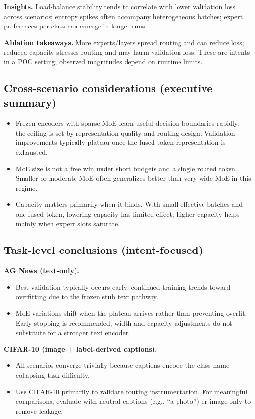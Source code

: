 \documentclass[11pt,a4paper]{article}
\begin{document}
\textbf{Insights.} Load-balance stability tends to correlate with lower validation loss across scenarios; entropy spikes often accompany heterogeneous batches; expert preferences per class can emerge in longer runs.

\textbf{Ablation takeaways.} More experts/layers spread routing and can reduce loss; reduced capacity stresses routing and may harm validation loss. These are intents in a POC setting; observed magnitudes depend on runtime limits.

\subsection*{Cross-scenario considerations (executive summary)}
\begin{itemize}[leftmargin=*]
  \item Frozen encoders with sparse MoE learn useful decision boundaries rapidly; the ceiling is set by representation quality and routing design. Validation improvements typically plateau once the fused-token representation is exhausted.
  \item MoE size is not a free win under short budgets and a single routed token. Smaller or moderate MoE often generalizes better than very wide MoE in this regime.
  \item Capacity matters primarily when it binds. With small effective batches and one fused token, lowering capacity has limited effect; higher capacity helps mainly when expert slots saturate.
\end{itemize}

\subsection*{Task-level conclusions (intent-focused)}
\textbf{AG News (text-only).}
\begin{itemize}[leftmargin=*]
  \item Best validation typically occurs early; continued training trends toward overfitting due to the frozen stub text pathway.
  \item MoE variations shift when the plateau arrives rather than preventing overfit. Early stopping is recommended; width and capacity adjustments do not substitute for a stronger text encoder.
\end{itemize}

\textbf{CIFAR-10 (image + label-derived captions).}
\begin{itemize}[leftmargin=*]
  \item All scenarios converge trivially because captions encode the class name, collapsing task difficulty.
  \item Use CIFAR-10 primarily to validate routing instrumentation. For meaningful comparisons, evaluate with neutral captions (e.g., “a photo”) or image-only to remove leakage.
\end{itemize}
\end{document}
